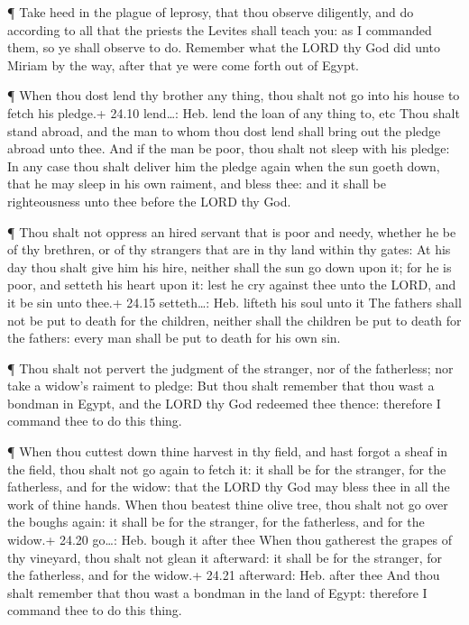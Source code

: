  ¶ Take heed in the plague of leprosy, that thou observe
diligently, and do according to all that the priests the Levites shall
teach you: as I commanded them, so ye shall observe to do. 
Remember what the LORD thy God did unto Miriam by the way, after that ye
were come forth out of Egypt.

 ¶ When thou dost lend thy brother any thing, thou shalt
not go into his house to fetch his pledge.+ 24.10 lend\ldots: Heb. lend
the loan of any thing to, etc  Thou shalt stand abroad, and
the man to whom thou dost lend shall bring out the pledge abroad unto
thee.  And if the man be poor, thou shalt not sleep with
his pledge:  In any case thou shalt deliver him the pledge
again when the sun goeth down, that he may sleep in his own raiment, and
bless thee: and it shall be righteousness unto thee before the LORD thy
God.

 ¶ Thou shalt not oppress an hired servant that is poor and
needy, whether he be of thy brethren, or of thy strangers that are in
thy land within thy gates:  At his day thou shalt give him
his hire, neither shall the sun go down upon it; for he is poor, and
setteth his heart upon it: lest he cry against thee unto the LORD, and
it be sin unto thee.+ 24.15 setteth\ldots: Heb. lifteth his soul unto it
 The fathers shall not be put to death for the children,
neither shall the children be put to death for the fathers: every man
shall be put to death for his own sin.

 ¶ Thou shalt not pervert the judgment of the stranger, nor
of the fatherless; nor take a widow's raiment to pledge: 
But thou shalt remember that thou wast a bondman in Egypt, and the LORD
thy God redeemed thee thence: therefore I command thee to do this thing.

 ¶ When thou cuttest down thine harvest in thy field, and
hast forgot a sheaf in the field, thou shalt not go again to fetch it:
it shall be for the stranger, for the fatherless, and for the widow:
that the LORD thy God may bless thee in all the work of thine hands.
 When thou beatest thine olive tree, thou shalt not go over
the boughs again: it shall be for the stranger, for the fatherless, and
for the widow.+ 24.20 go\ldots: Heb. bough it after thee 
When thou gatherest the grapes of thy vineyard, thou shalt not glean it
afterward: it shall be for the stranger, for the fatherless, and for the
widow.+ 24.21 afterward: Heb. after thee  And thou shalt
remember that thou wast a bondman in the land of Egypt: therefore I
command thee to do this thing.

